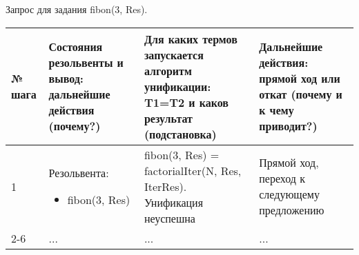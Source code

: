 \documentclass[14pt,a4paper]{scrreprt}
\begin{document}
Запрос для задания fibon(3, Res).
\begin{table}[H]
	\begin{tabular}{|p{0.8cm\small}|p{4.7cm\small}|p{5.7cm\small}|p{4cm\small}|}	
		\hline
		№ шага & Состояния резольвенты и вывод: дальнейшие действия (почему?) & Для каких термов запускается алгоритм унификации: T1=T2 и каков результат (подстановка) & Дальнейшие действия: прямой ход или откат (почему и к чему приводит?)\\
		\hline
		1 & Резольвента:\begin{itemize} \item fibon(3, Res) \end{itemize} & fibon(3, Res) = factorialIter(N, Res, IterRes). Унификация неуспешна & Прямой ход, переход к следующему предложению \\
		\hline
		2-6 & ... & ... & ...\\
		\hline
	\end{tabular}
\end{table}
\end{document}
